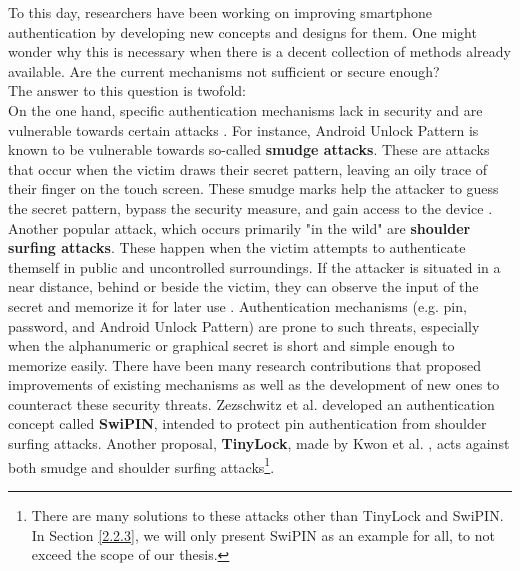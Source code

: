 To this day, researchers have been working on improving smartphone authentication by developing new concepts and designs for them. One might wonder why this is necessary when there is a decent collection of methods already available. Are the current mechanisms not sufficient or secure enough? \\

The answer to this question is twofold:\\

On the one hand, specific authentication mechanisms lack in security and are vulnerable towards certain attacks \cite{Schloeglhofer}. For instance, Android Unlock Pattern is known to be vulnerable towards so-called \textbf{smudge attacks}. These are attacks that occur when the victim draws their secret pattern, leaving an oily trace of their finger on the touch screen. These smudge marks help the attacker to guess the secret pattern, bypass the security measure, and gain access to the device \cite{ediss20251}. Another popular attack, which occurs primarily "in the wild" are \textbf{shoulder surfing attacks}. These happen when the victim attempts to authenticate themself in public and uncontrolled surroundings. If the attacker is situated in a near distance, behind or beside the victim, they can observe the input of the secret and memorize it for later use \cite{ediss20251}. Authentication mechanisms (e.g. pin, password, and Android Unlock Pattern) are prone to such threats, especially when the alphanumeric or graphical secret is short and simple enough to memorize easily. There have been many research contributions that proposed improvements of existing mechanisms as well as the development of new ones to counteract these security threats. Zezschwitz et al. \cite{vonZezschwitz:2015:SFS:2702123.2702212} developed an authentication concept called \textbf{SwiPIN}, intended to protect pin authentication from shoulder surfing attacks. Another proposal, \textbf{TinyLock}, made by Kwon et al. \cite{kwon}, acts against both smudge and shoulder surfing attacks\footnote{There are many solutions to these attacks other than TinyLock and SwiPIN. In Section \ref{2.2.3}, we will only present SwiPIN as an example for all, to not exceed the scope of our thesis.}.\\

